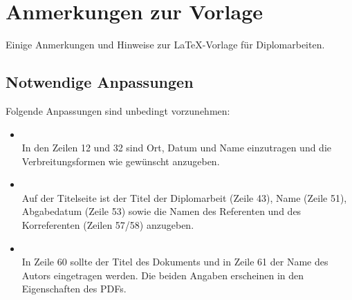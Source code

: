 \chapter{Anmerkungen zur Vorlage}
Einige Anmerkungen und Hinweise zur \LaTeX{}-Vorlage für Diplomarbeiten.
\section{Notwendige Anpassungen}
\label{ref:anpassungen}
Folgende Anpassungen sind unbedingt vorzunehmen:
\begin{itemize}
	\item {}\\
	In den Zeilen 12 und 32 sind Ort, Datum und Name einzutragen und die Verbreitungsformen wie gewünscht anzugeben.
	\item {}\\
	Auf der Titelseite ist der Titel der Diplomarbeit (Zeile 43), Name (Zeile 51), Abgabedatum (Zeile 53) sowie die Namen des Referenten und des Korreferenten (Zeilen 57/58) anzugeben.  
	\item {}\\
	In Zeile 60 sollte der Titel des Dokuments und in Zeile 61 der Name des Autors eingetragen werden. Die beiden Angaben erscheinen in den Eigenschaften des PDFs.
\end{itemize}
